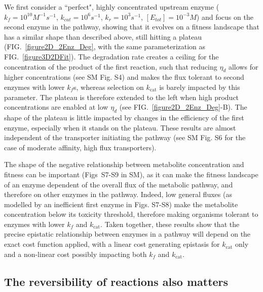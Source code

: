 \documentclass[nogrid,crop,final]{MBE2}%
\begin{document}
We first consider a ``perfect", highly concentrated upstream enzyme ($k_f=10^{10}M^{-1}s^{-1}$, $k_{cat}=10^6s^{-1}$, $k_r=10^3s^{-1}$, $[E_{tot}]=10^{-3}M$) and focus on the second enzyme in the pathway, showing that it evolves on a fitness landscape that has a similar shape than described above, still hitting a plateau (FIG.~\ref{figure2D_2Enz_Deg}, with the same parameterization as FIG.~\ref{figure3D2DFit}). The degradation rate creates a ceiling for the concentration of the product of the first reaction, such that reducing $\eta_{d}$ allows for higher concentrations (see SM Fig. S4) and makes the flux tolerant to second enzymes with lower $k_f$s, whereas selection on $k_\text{cat}$ is barely impacted by this parameter. The plateau is therefore extended to the left when high product concentrations are enabled at low $\eta_{d}$ (see FIG.~\ref{figure2D_2Enz_Deg}-B). The shape of the plateau is little impacted by changes in the efficiency of the first enzyme, especially when it stands on the plateau. These results are almost independent of the transporter initiating the pathway %
(see SM Fig. S6 for the case of moderate affinity, high flux transporters). 

The shape of the negative relationship between metabolite concentration and fitness can be important (Figs~S7-S9 in SM), as it can make the fitness landscape of an enzyme dependent of the overall flux of the metabolic pathway, and therefore on other enzymes in the pathway. Indeed, low general fluxes (as modelled by an inefficient first enzyme in Figs. S7-S8) make the metabolite concentration below its toxicity threshold, therefore making organisms tolerant to enzymes with lower $k_f$ and $k_\text{cat}$. Taken together, these results show that the precise epistatic relationship between enzymes in a pathway will depend on the exact cost function applied, with a linear cost generating epistasis for $k_\text{cat}$ only and a non-linear cost possibly impacting both $k_f$ and $k_\text{cat}$. 
\subsection{The reversibility of reactions also matters}
\end{document}
